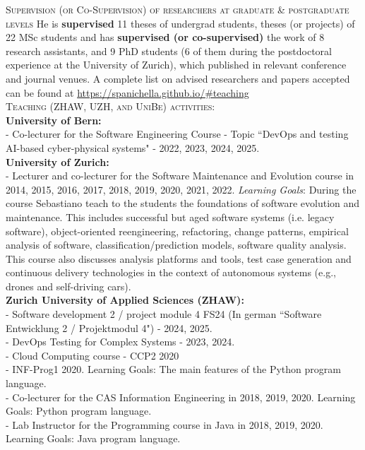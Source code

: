 \documentclass[11pt]{article}
\begin{document}
\medskip \medskip
\textsc{Supervision (or Co-Supervision) of researchers at graduate \& postgraduate levels}
\medskip
He is \textbf{supervised} 11 theses of undergrad students, theses (or projects) of 22 MSc students and has \textbf{supervised (or co-supervised)} the work of 8 research assistants, and 9 PhD students (6 of them during the postdoctoral experience at the University of Zurich), which published in relevant conference and journal venues. A complete list on advised researchers and papers accepted can be found at
\href{https://spanichella.github.io/\#teaching}{https://spanichella.github.io/\#teaching}
\medskip \\%
\textsc{Teaching (ZHAW, UZH, and UniBe) activities:}
\medskip \\
\textbf{University of Bern:}
\medskip \\
-   Co-lecturer for the Software Engineering Course - Topic ``DevOps and testing AI-based cyber-physical systems" - 2022, 2023, 2024, 2025.  
\medskip \\ 
\textbf{University of Zurich:} 
\medskip \\
-   Lecturer and co-lecturer for the Software Maintenance and Evolution course in 2014, 2015, 2016, 2017, 2018, 2019, 2020, 2021, 2022.   \textit{Learning Goals}: During the course Sebastiano teach to
the students the foundations of software evolution and maintenance. This includes successful but aged software systems (i.e. legacy software), object-oriented reengineering, refactoring, change patterns, empirical analysis of software, classification/prediction models, software quality analysis. This course also discusses analysis platforms and tools, test case generation and continuous delivery technologies in the context of autonomous systems (e.g., drones and self-driving cars).
\medskip \\
\textbf{Zurich University of Applied Sciences (ZHAW):}
\medskip \\
- Software development 2 / project module 4 FS24 (In german ``Software Entwicklung 2 / Projektmodul 4") - 2024, 2025.\\
- DevOps Testing for Complex Systems - 2023, 2024. \\
- Cloud Computing course - CCP2 2020\\
- INF-Prog1 2020. Learning Goals: The main features of the Python program language.\\
- Co-lecturer for the CAS Information Engineering in 2018, 2019, 2020.
Learning Goals: Python program language.\\
- Lab Instructor for the Programming course in Java in 2018, 2019, 2020.
Learning Goals: Java program language.
\medskip 
\vspace{-5mm} 
\end{document}
